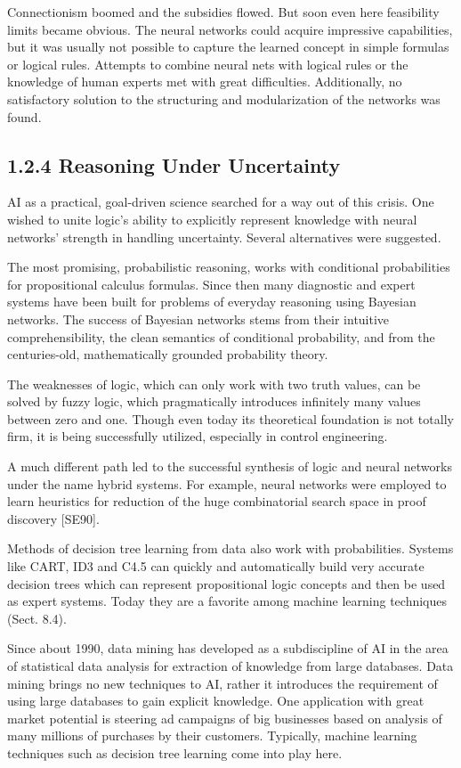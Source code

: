 \documentclass[10pt]{article}
\begin{document}
Connectionism boomed and the subsidies flowed. But soon even here feasibility limits became obvious. The neural networks could acquire impressive capabilities, but it was usually not possible to capture the learned concept in simple formulas or logical rules. Attempts to combine neural nets with logical rules or the knowledge of human experts met with great difficulties. Additionally, no satisfactory solution to the structuring and modularization of the networks was found.

\subsection*{1.2.4 Reasoning Under Uncertainty}
AI as a practical, goal-driven science searched for a way out of this crisis. One wished to unite logic's ability to explicitly represent knowledge with neural networks' strength in handling uncertainty. Several alternatives were suggested.

The most promising, probabilistic reasoning, works with conditional probabilities for propositional calculus formulas. Since then many diagnostic and expert systems have been built for problems of everyday reasoning using Bayesian\\
networks. The success of Bayesian networks stems from their intuitive comprehensibility, the clean semantics of conditional probability, and from the centuries-old, mathematically grounded probability theory.

The weaknesses of logic, which can only work with two truth values, can be solved by fuzzy logic, which pragmatically introduces infinitely many values between zero and one. Though even today its theoretical foundation is not totally firm, it is being successfully utilized, especially in control engineering.

A much different path led to the successful synthesis of logic and neural networks under the name hybrid systems. For example, neural networks were employed to learn heuristics for reduction of the huge combinatorial search space in proof discovery [SE90].

Methods of decision tree learning from data also work with probabilities. Systems like CART, ID3 and C4.5 can quickly and automatically build very accurate decision trees which can represent propositional logic concepts and then be used as expert systems. Today they are a favorite among machine learning techniques (Sect. 8.4).

Since about 1990, data mining has developed as a subdiscipline of AI in the area of statistical data analysis for extraction of knowledge from large databases. Data mining brings no new techniques to AI, rather it introduces the requirement of using large databases to gain explicit knowledge. One application with great market potential is steering ad campaigns of big businesses based on analysis of many millions of purchases by their customers. Typically, machine learning techniques such as decision tree learning come into play here.
\end{document}

